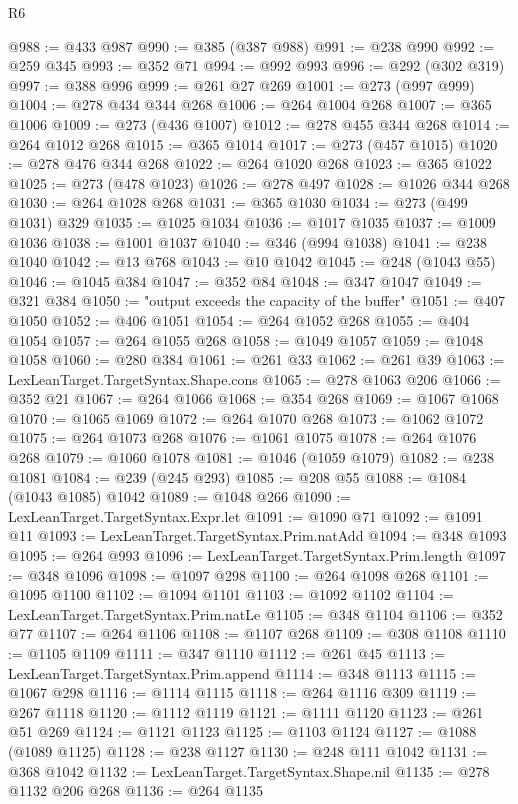 \begin{lexlean}{R6}
\begin{coremodule}
{{{{{{{{{{{{{{{{{{{@988 := @433 @987
@990 := @385 (@387 @988)
@991 := @238 @990
@992 := @259 @345
@993 := @352 @71
@994 := @992 @993
@996 := @292 (@302 @319)
@997 := @388 @996
@999 := @261 @27 @269
@1001 := @273 (@997 @999)
@1004 := @278 @434 @344 @268
@1006 := @264 @1004 @268
@1007 := @365 @1006
@1009 := @273 (@436 @1007)
@1012 := @278 @455 @344 @268
@1014 := @264 @1012 @268
@1015 := @365 @1014
@1017 := @273 (@457 @1015)
@1020 := @278 @476 @344 @268
@1022 := @264 @1020 @268
@1023 := @365 @1022
@1025 := @273 (@478 @1023)
@1026 := @278 @497
@1028 := @1026 @344 @268
@1030 := @264 @1028 @268
@1031 := @365 @1030
@1034 := @273 (@499 @1031) @329
@1035 := @1025 @1034
@1036 := @1017 @1035
@1037 := @1009 @1036
@1038 := @1001 @1037
@1040 := @346 (@994 @1038)
@1041 := @238 @1040
@1042 := @13 @768
@1043 := @10 @1042
@1045 := @248 (@1043 @55)
@1046 := @1045 @384
@1047 := @352 @84
@1048 := @347 @1047
@1049 := @321 @384
@1050 := "output exceeds the capacity of the buffer"
@1051 := @407 @1050
@1052 := @406 @1051
@1054 := @264 @1052 @268
@1055 := @404 @1054
@1057 := @264 @1055 @268
@1058 := @1049 @1057
@1059 := @1048 @1058
@1060 := @280 @384
@1061 := @261 @33
@1062 := @261 @39
@1063 := LexLeanTarget.TargetSyntax.Shape.cons
@1065 := @278 @1063 @206
@1066 := @352 @21
@1067 := @264 @1066
@1068 := @354 @268
@1069 := @1067 @1068
@1070 := @1065 @1069
@1072 := @264 @1070 @268
@1073 := @1062 @1072
@1075 := @264 @1073 @268
@1076 := @1061 @1075
@1078 := @264 @1076 @268
@1079 := @1060 @1078
@1081 := @1046 (@1059 @1079)
@1082 := @238 @1081
@1084 := @239 (@245 @293)
@1085 := @208 @55
@1088 := @1084 (@1043 @1085) @1042
@1089 := @1048 @266
@1090 := LexLeanTarget.TargetSyntax.Expr.let
@1091 := @1090 @71
@1092 := @1091 @11
@1093 := LexLeanTarget.TargetSyntax.Prim.natAdd
@1094 := @348 @1093
@1095 := @264 @993
@1096 := LexLeanTarget.TargetSyntax.Prim.length
@1097 := @348 @1096
@1098 := @1097 @298
@1100 := @264 @1098 @268
@1101 := @1095 @1100
@1102 := @1094 @1101
@1103 := @1092 @1102
@1104 := LexLeanTarget.TargetSyntax.Prim.natLe
@1105 := @348 @1104
@1106 := @352 @77
@1107 := @264 @1106
@1108 := @1107 @268
@1109 := @308 @1108
@1110 := @1105 @1109
@1111 := @347 @1110
@1112 := @261 @45
@1113 := LexLeanTarget.TargetSyntax.Prim.append
@1114 := @348 @1113
@1115 := @1067 @298
@1116 := @1114 @1115
@1118 := @264 @1116 @309
@1119 := @267 @1118
@1120 := @1112 @1119
@1121 := @1111 @1120
@1123 := @261 @51 @269
@1124 := @1121 @1123
@1125 := @1103 @1124
@1127 := @1088 (@1089 @1125)
@1128 := @238 @1127
@1130 := @248 @111 @1042
@1131 := @368 @1042
@1132 := LexLeanTarget.TargetSyntax.Shape.nil
@1135 := @278 @1132 @206 @268
@1136 := @264 @1135
}}}}}}}}}}}}}}}}}}}
\end{coremodule}
\end{lexlean}
